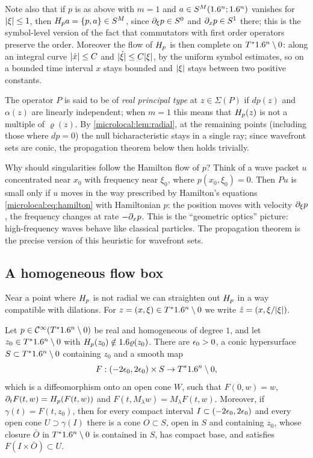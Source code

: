 Note also that if $p$ is as above with $m=1$ and $a\in S^M(1.6^n;1.6^n)$
vanishes for $\lvert \xi\rvert\le1$, then $H_{p}a=\{p,a\}\in S^M$, since $\partial_\xi p\in
S^0$ and $\partial_xp\in S^1$ there; this is the symbol-level version of the fact
that commutators with first order operators preserve the order. Moreover the
flow of $H_{p}$ is then complete on $T^*1.6^n\setminus0$: along an integral curve
$\lvert \dot x\rvert\le C$ and $\lvert \dot\xi\rvert\le C\lvert \xi\rvert$, by the uniform symbol
estimates, so on a bounded time interval $x$ stays bounded and $\lvert \xi\rvert$ stays
between two positive constants.

The operator $P$ is said to be of \emph{real principal type} at
$z\in\Sigma(P)$ if $dp(z)$ and $\alpha(z)$ are linearly independent; when $m=1$
this means that $H_{p}(z)$ is not a multiple of $\varrho(z)$. By
\cref{microlocal:lem:radial}, at the remaining points (including those where
$dp=0$) the null bicharacteristic stays in a single ray; since wavefront sets
are conic, the propagation theorem below then holds trivially.

\begin{discussion}
  Why should singularities follow the Hamilton flow of $p$? Think of a wave
  packet $u$ concentrated near $x_0$ with frequency near $\xi_0$, where
  $p(x_0,\xi_0)=0$. Then $Pu$ is small only if $u$ moves in the way prescribed
  by Hamilton's equations \eqref{microlocal:eq:hamilton} with Hamiltonian $p$:
  the position moves with velocity $\partial_\xi p$, the frequency changes at rate
  $-\partial_xp$. This is the ``geometric optics'' picture: high-frequency waves
  behave like classical particles. The propagation theorem is the precise
  version of this heuristic for wavefront sets.
\end{discussion}

\subsection{A homogeneous flow box}
Near a point where $H_{p}$ is not radial we can straighten out $H_{p}$ in
a way compatible with dilations. For $z=(x,\xi)\in T^*1.6^n\setminus0$ we write
$\hat z=(x,\xi/\lvert \xi\rvert)$.

\begin{lemma}\label{microlocal:lem:flow-box}
  Let $p\in\mathcal{C}^\infty(T^*1.6^n\setminus0)$ be real and homogeneous of degree $1$, and let
  $z_0\in T^*1.6^n\setminus0$ with $H_{p}(z_0)\notin1.6\varrho(z_0)$. There are
  $\epsilon_0>0$, a conic hypersurface $S\subset T^*1.6^n\setminus0$ containing $z_0$ and a
  smooth map
  \begin{equation*}
    F:(-2\epsilon_0,2\epsilon_0)\times S\to T^*1.6^n\setminus0,
  \end{equation*}
  which is a diffeomorphism onto an open cone $W$, such that $F(0,w)=w$,
  $\partial_tF(t,w)=H_{p}(F(t,w))$ and $F(t,M_\lambda w)=M_\lambda F(t,w)$.
  Moreover, if $\gamma(t)=F(t,z_0)$, then for every compact interval
  $I\subset(-2\epsilon_0,2\epsilon_0)$ and every open cone $U\supset\gamma(I)$ there is a
  cone $O\subset S$, open in $S$ and containing $z_0$, whose closure $\bar O$ in
  $T^*1.6^n\setminus0$ is contained in $S$, has compact base, and satisfies
  $F(I\times\bar O)\subset U$.
\end{lemma}

